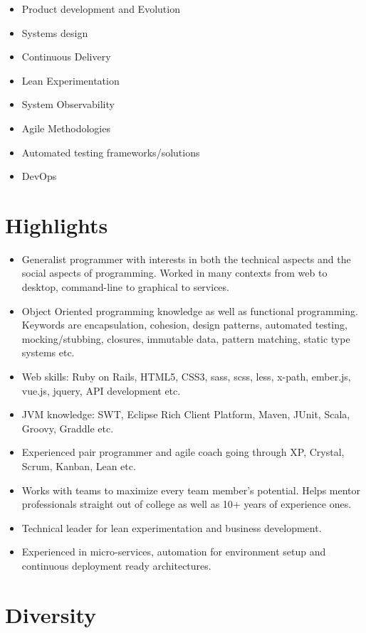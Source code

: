 \documentclass[letter,10pt]{article}
\begin{document}
\begin{itemize}
\item Product development and Evolution
\item Systems design
\item Continuous Delivery
\item Lean Experimentation
\item System Observability
\item Agile Methodologies
\item Automated testing frameworks/solutions
\item DevOps
\end{itemize}

\section{Highlights}

\begin{itemize}
\item Generalist programmer with interests in both the technical
  aspects and the social aspects of programming. Worked in many contexts from web to desktop, command-line to graphical to services.
\item Object Oriented programming knowledge as well as functional programming. Keywords are encapsulation, cohesion, design patterns, automated testing, mocking/stubbing, closures, immutable data, pattern matching, static type systems etc.
\item Web skills: Ruby on Rails, HTML5, CSS3, sass, scss, less, x-path, ember.js, vue.js, jquery, API development etc.
\item JVM knowledge: SWT, Eclipse Rich Client Platform, Maven, JUnit, Scala, Groovy, Graddle etc.
\item Experienced pair programmer and agile coach going through XP, Crystal, Scrum, Kanban, Lean etc.
\item Works with teams to maximize every team member's potential. Helps mentor professionals straight out of college as well as 10+ years of experience ones.
\item Technical leader for lean experimentation and business development.
\item Experienced in micro-services, automation for environment setup and continuous deployment ready architectures.
\end{itemize}

\section{Diversity}
\end{document}
